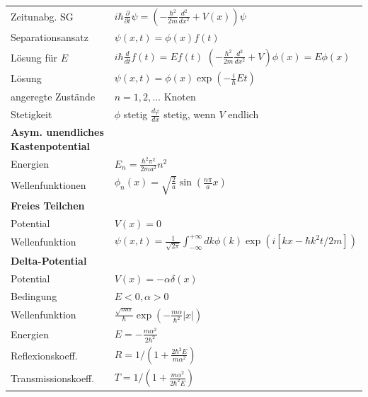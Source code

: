 \documentclass[12pt,a4paper]{article}
\newcommand{\abs}[1]{\left| #1 \right|}
\renewcommand{\d}[2]{\frac{d #1}{d #2}}
\newcommand{\dd}[2]{\frac{d^2 #1}{d #2^2}}
\newcommand{\pd}[2]{\frac{\partial #1}{\partial #2}}
\renewcommand{\=}[1]{\stackrel{#1}{=}}
\theoremstyle{definition}
\theoremstyle{remark}
\begin{document}
\begin{minipage}[t]{.5\linewidth}
\vspace{0pt}
\noindent\begin{tabular}{ll}

Zeitunabg. SG & $i \hbar \pd{}{t} \psi = (-\frac{\hbar^2}{2m}\dd{}{x} + V(x))\psi$\\
Separationsansatz & $\psi(x, t) = \phi(x) f(t)$\\
Lösung für $E$ & \makecell[l]{$i \hbar \d{}{t} f(t) = E f(t)$\\$(-\frac{\hbar^2}{2m} \dd{}{x} + V) \phi(x) = E \phi (x)$}\\
Lösung & $\psi(x, t) = \phi(x) \exp(- \frac{i}{\hbar} E t)$\\
angeregte Zustände & $n = 1, 2, ...$ Knoten\\
Stetigkeit & \makecell[l]{$\phi$ stetig\\$\d{\varphi}{x}$ stetig, wenn $V$ endlich}\\

\textbf{Asym. unendliches Kastenpotential} & \\
Energien & $E_n = \frac{\hbar^2 \pi^2}{2ma^2} n^2$\\
Wellenfunktionen & $\phi_n(x) = \sqrt{\frac{2}{a}} \sin (\frac{n \pi}{a}x)$\\

\textbf{Freies Teilchen} & \\
Potential & $V(x) = 0$\\
Wellenfunktion & $\psi (x, t) = \frac{1}{\sqrt{2\pi}} \int_{-\infty}^{+\infty} dk \phi(k) \exp(i[kx - \hbar k^2 t / 2m])$\\

\textbf{Delta-Potential} & \\
Potential & $V(x) = - \alpha \delta (x)$\\
Bedingung & $E < 0, \alpha > 0$\\
Wellenfunktion & $\frac{\sqrt{m\alpha}}{\hbar} \exp(-\frac{m\alpha}{\hbar^2} \abs{x})$\\
Energien & $E = - \frac{m\alpha^2}{2\hbar^2}$\\
Reflexionskoeff. & $R = 1/(1 + \frac{2\hbar^2 E}{m\alpha^2})$\\
Transmissionskoeff. & $T = 1/(1 + \frac{m\alpha^2}{2\hbar^2 E})$\\


\end{tabular}
\end{minipage}%
\begin{minipage}[t]{.5\linewidth}
\vspace{0pt}
\begin{tabular}{ll}


\end{tabular}
\end{minipage}
\end{document}
